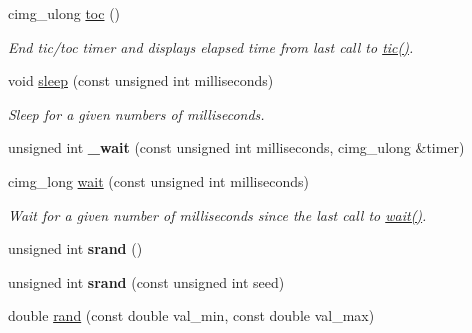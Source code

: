 \begin{DoxyCompactItemize}
cimg\+\_\+ulong \hyperlink{namespacecimg__library__suffixed_1_1cimg_affb2a0951f575b9c39b83d0fd836a26d}{toc} ()
\begin{DoxyCompactList}\small\item\em End tic/toc timer and displays elapsed time from last call to \hyperlink{namespacecimg__library__suffixed_1_1cimg_a5bd41788a0caabcc16754f18b3454321}{tic()}. \end{DoxyCompactList}\item 
void \hyperlink{namespacecimg__library__suffixed_1_1cimg_aa2bf8fb0d97c122cbc52e1f2e167e8a6}{sleep} (const unsigned int milliseconds)
\begin{DoxyCompactList}\small\item\em Sleep for a given numbers of milliseconds. \end{DoxyCompactList}\item 
\mbox{\label{namespacecimg__library__suffixed_1_1cimg_a204c82b3ebad23bf1c996e216bbed9ad}} 
unsigned int {\bfseries \+\_\+wait} (const unsigned int milliseconds, cimg\+\_\+ulong \&timer)
\item 
cimg\+\_\+long \hyperlink{namespacecimg__library__suffixed_1_1cimg_a8431f8cf0989f40df3b6ac7d9dc90abd}{wait} (const unsigned int milliseconds)
\begin{DoxyCompactList}\small\item\em Wait for a given number of milliseconds since the last call to \hyperlink{namespacecimg__library__suffixed_1_1cimg_a8431f8cf0989f40df3b6ac7d9dc90abd}{wait()}. \end{DoxyCompactList}\item 
\mbox{\label{namespacecimg__library__suffixed_1_1cimg_ab77520695d7b96687093353c613c410c}} 
unsigned int {\bfseries srand} ()
\item 
\mbox{\label{namespacecimg__library__suffixed_1_1cimg_abae779a6d52b74e3a46e75a6c5b6e49e}} 
unsigned int {\bfseries srand} (const unsigned int seed)
\item 
\mbox{\label{namespacecimg__library__suffixed_1_1cimg_ab7c09300be61c8a3361c379069100252}} 
double \hyperlink{namespacecimg__library__suffixed_1_1cimg_ab7c09300be61c8a3361c379069100252}{rand} (const double val\+\_\+min, const double val\+\_\+max)

\end{DoxyCompactItemize}
